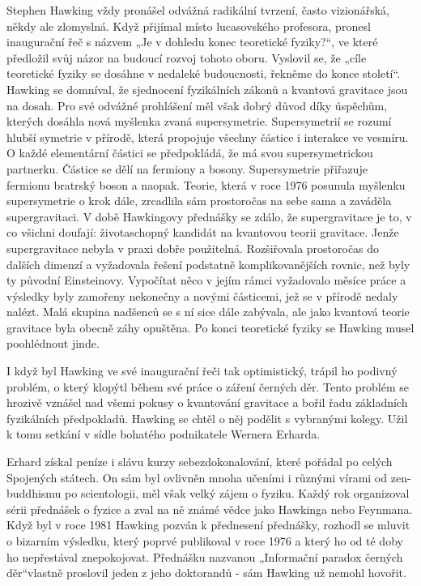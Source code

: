   Stephen Hawking vždy pronášel odvážná radikální tvrzení, často vizionářská, někdy ale zlomyslná.
  Když přijímal místo lucasovského profesora, pronesl inaugurační řeč s názvem „Je v dohledu konec
  teoretické fyziky?“, ve které předložil svůj názor na budoucí rozvoj tohoto oboru. Vyslovil se, že
  „cíle teoretické fyziky se dosáhne v nedaleké budoucnosti, řekněme do konce století“. Hawking se
  domníval, že sjednocení fyzikálních zákonů a kvantová gravitace jsou na dosah. Pro své odvážné
  prohlášení měl však dobrý důvod díky úspěchům, kterých dosáhla nová myšlenka zvaná supersymetrie.
  Supersymetrií se rozumí hlubší symetrie v přírodě, která propojuje všechny částice i interakce ve
  vesmíru. O každé elementární částici se předpokládá, že má svou supersymetrickou partnerku.
  Částice se dělí na fermiony a bosony. Supersymetrie přiřazuje fermionu bratrský boson a naopak.
  Teorie, která v roce 1976 posunula myšlenku supersymetrie o krok dále, zrcadlila sám prostoročas
  na sebe sama a zaváděla supergravitaci. V době Hawkingovy přednášky se zdálo, že supergravitace je
  to, v co všichni doufají: životaschopný kandidát na kvantovou teorii gravitace. Jenže
  supergravitace nebyla v praxi dobře použitelná. Rozšiřovala prostoročas do dalších dimenzí a
  vyžadovala řešení podstatně komplikovanějších rovnic, než byly ty původní Einsteinovy. Vypočítat
  něco v jejím rámci vyžadovalo měsíce práce a výsledky byly zamořeny nekonečny a novými částicemi,
  jež se v přírodě nedaly nalézt. Malá skupina nadšenců se s ní sice dále zabývala, ale jako
  kvantová teorie gravitace byla obecně záhy opuštěna. Po konci teoretické fyziky se Hawking musel
  poohlédnout jinde. 
  
  I když byl Hawking ve své inaugurační řeči tak optimistický, trápil ho podivný problém, o který
  klopýtl během své práce o záření černých děr. Tento problém se hrozivě vznášel nad všemi pokusy o
  kvantování gravitace a bořil řadu základních fyzikálních předpokladů. Hawking se chtěl o něj
  podělit s vybranými kolegy. Užil k tomu setkání v sídle bohatého podnikatele Wernera Erharda.
  
  Erhard získal peníze i slávu kurzy sebezdokonalování, které pořádal po celých Spojených státech.
  On sám byl ovlivněn mnoha učeními i různými vírami od zen-buddhismu po scientologii, měl však
  velký zájem o fyziku. Každý rok organizoval sérii přednášek o fyzice a zval na ně známé vědce jako
  Hawkinga nebo Feynmana. Když byl v roce 1981 Hawking pozván k přednesení přednášky, rozhodl se
  mluvit o bizarním výsledku, který poprvé publikoval v roce 1976 a který ho od té doby ho
  nepřestával znepokojovat. Přednášku nazvanou „Informační paradox černých děr“vlastně proslovil
  jeden z jeho doktorandů - sám Hawking už nemohl hovořit. 
  

